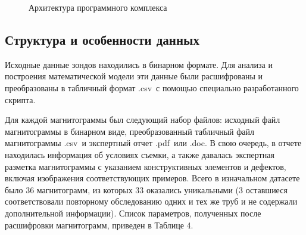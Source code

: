 \documentclass[a4paper,article,14pt]{extarticle}
\begin{document}
\begin{figure}[ht]
    \begin{center}
    
    \caption{
    \label{image3}
    Архитектура программного комплекса}
    \end {center}
\end {figure}

\subsection{Структура и особенности данных}

Исходные данные зондов находились в бинарном формате. 
Для анализа и построения математической модели 
эти данные были расшифрованы и преобразованы в табличный формат \flqq .csv\frqq\,
с помощью специально разработанного скрипта. 

Для каждой магнитограммы был следующий набор файлов: 
исходный файл магнитограммы в бинарном виде, преобразованный 
табличный файл магнитограммы \flqq .csv\frqq\,  и экспертный отчет \flqq .pdf\frqq\,  или \flqq .doc\frqq. 
В свою очередь, в отчете находилась информация об условиях съемки, 
а также давалась экспертная разметка магнитограммы с указанием конструктивных
элементов и дефектов, включая изображения соответствующих примеров. 
Всего в изначальном датасете было 36 магнитограмм, из которых 33 оказались 
уникальными (3 оставшиеся соответствовали повторному обследованию одних и 
тех же труб и не содержали дополнительной информации). Список параметров, полученных после 
расшифровки магнитограмм, приведен в Таблице 4. 
\end{document}
